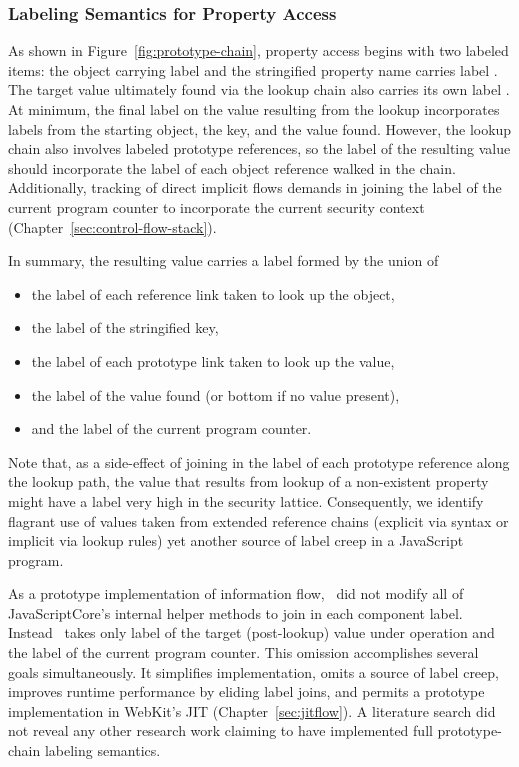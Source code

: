 \subsubsection{Labeling Semantics for Property Access}
As shown in Figure~\ref{fig:prototype-chain}, property access begins with two labeled items: the object  carrying label  and the stringified property name  carries label .
The target value  ultimately found via the lookup chain also carries its own label .
At minimum, the final label on the value resulting from the lookup incorporates labels from the starting object, the key, and the value found.
However, the lookup chain also involves labeled prototype references, so the label of the resulting value should incorporate the label of each object reference walked in the chain.
Additionally, tracking of direct implicit flows demands in joining the label of the current program counter to incorporate the current security context (Chapter~\ref{sec:control-flow-stack}).

In summary, the resulting value carries a label formed by the union of
\begin{itemize}
  \item the label of each reference link taken to look up the object,
  \item the label of the stringified key,
  \item the label of each prototype link taken to look up the value,
  \item the label of the value found (or bottom if no value present),
  \item and the label of the current program counter.
\end{itemize}

Note that, as a side-effect of joining in the label of each prototype reference along the lookup path, the  value that results from lookup of a non-existent property might have a label very high in the security lattice.
Consequently, we identify flagrant use of values taken from extended reference chains (explicit via syntax or implicit via lookup rules) yet another source of label creep in a JavaScript program.

As a prototype implementation of information flow, \FlowCore\ did not modify all of JavaScriptCore's internal helper methods to join in each component label.
Instead \FlowCore\ takes only label of the target (post-lookup) value under operation and the label of the current program counter.
This omission accomplishes several goals simultaneously.
It simplifies implementation, omits a source of label creep, improves runtime performance by eliding label joins, and permits a prototype implementation in WebKit's JIT (Chapter~\ref{sec:jitflow}).
A literature search did not reveal any other research work claiming to have implemented full prototype-chain labeling semantics. %


